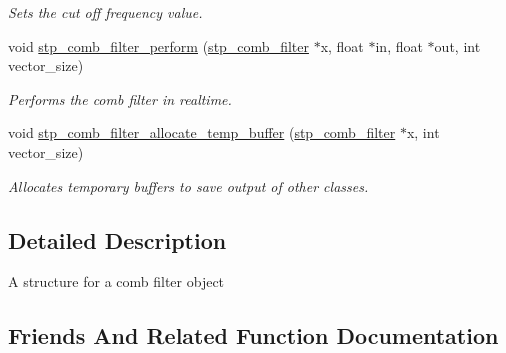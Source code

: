\begin{DoxyCompactItemize}
\begin{DoxyCompactList}\small\item\em Sets the cut off frequency value. ~\newline
 \end{DoxyCompactList}\item 
void \hyperlink{structstp__comb__filter_af42bb71a315d240d6a4ee850d429b458}{stp\+\_\+comb\+\_\+filter\+\_\+perform} (\hyperlink{structstp__comb__filter}{stp\+\_\+comb\+\_\+filter} $\ast$x, float $\ast$in, float $\ast$out, int vector\+\_\+size)
\begin{DoxyCompactList}\small\item\em Performs the comb filter in realtime. ~\newline
 \end{DoxyCompactList}\item 
void \hyperlink{structstp__comb__filter_ae386c285511e2c488156cfbff5e6bbc5}{stp\+\_\+comb\+\_\+filter\+\_\+allocate\+\_\+temp\+\_\+buffer} (\hyperlink{structstp__comb__filter}{stp\+\_\+comb\+\_\+filter} $\ast$x, int vector\+\_\+size)
\begin{DoxyCompactList}\small\item\em Allocates temporary buffers to save output of other classes. ~\newline
 \end{DoxyCompactList}\end{DoxyCompactItemize}


\subsection{Detailed Description}
A structure for a comb filter object ~\newline
 

\subsection{Friends And Related Function Documentation}
\mbox{\label{structstp__comb__filter_ae386c285511e2c488156cfbff5e6bbc5}} 
